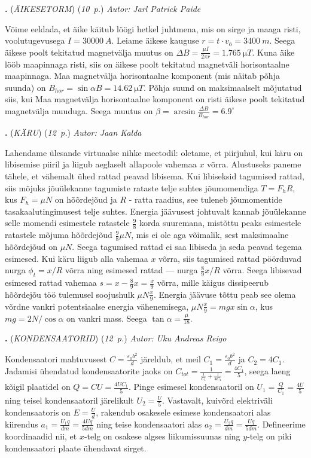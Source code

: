 \documentclass[11pt,a5paper]{article}
\newcommand{\numb}[1]{\vspace{5pt}\textbf{\large #1}}
\newcommand{\nimi}[1]{(\textsl{\small #1})}
\newcommand{\punktid}[1]{(\emph{#1~p.})}
\newcounter{ylesanne}
\newcommand{\yl}[1]{\addtocounter{ylesanne}{1}\numb{\theylesanne.} \nimi{#1} \newblock{}}
\newcommand{\autor}[1]{\emph{ Autor: #1}}%
\begin{document}
\newpage
\yl{ÄIKESETORM}
\punktid{10} \autor{Jarl Patrick Paide}

Võime eeldada, et äike käitub löögi hetkel juhtmena, mis on sirge ja maaga risti, voolutugevusega $I = \SI{30000}{A}$. Leiame äikese kauguse $r = t\cdot v_{õ} = \SI{3400}{m}$. Seega äikese poolt tekitatud magnetvälja muutus on $\Delta B = \frac{\mu I}{2\pi r} = \SI{1.765}{\micro T}$. Kuna äike lööb maapinnaga risti, siis on äikese poolt tekitatud magnetväli horisontaalne maapinnaga. Maa magnetvälja horisontaalne komponent (mis näitab põhja suunda) on $B_{hor} = \sin{\alpha}B = \SI{14.62}{\micro T}$. Põhja suund on maksimaalselt mõjutatud siis, kui Maa magnetvälja horisontaalne komponent on risti äikese poolt tekitatud magnetvälja muuduga. Seega muutus on $\beta = \arcsin{\frac{\Delta B}{B_{hor}}} = 6.9^{\circ}$



\yl{KÄRU}
\punktid{12} \autor{Jaan Kalda}

Lahendame ülesande virtuaalse nihke meetodil: oletame, et piirjuhul, kui käru on libisemise piiril ja liigub aeglaselt allapoole vahemaa $x$ võrra. Alustuseks paneme tähele, et vähemalt ühed rattad peavad libisema. Kui libiseksid tagumised rattad, siis mõjuks jõuülekanne tagumiste rataste telje suhtes jõumomendiga $T=F_hR$, kus $F_h=\mu N$ on hõõrdejõud ja $R$ - ratta raadius, see tuleneb jõumomentide tasakaalutingimusest telje suhtes. Energia jäävusest johtuvalt kannab jõuülekanne selle momendi esimestele ratastele $\frac 98$ korda suuremana, mistõttu peaks esimestele ratastele mõjuma hõõrdejõud $\frac 98\mu N$, mis ei ole aga võimalik, sest maksimaalne hõõrdejõud on $\mu N$. Seega tagumised rattad ei saa libiseda ja seda peavad tegema esimesed. Kui käru liigub alla vahemaa $x$ võrra, siis  tagumised rattad pöörduvad nurga $\phi_t=x/R$ võrra ning esimesed rattad --- nurga $\frac 89x/R$ võrra. Seega libisevad esimesed rattad vahemaa $s=x-\frac 89x=\frac x9$ võrra, mille käigus dissipeerub hõõrdejõu töö tulemusel soojushulk $\mu N\frac x9$. Energia jäävuse tõttu peab see olema võrdne vankri potentsiaalse energia vähenemisega, $\mu N\frac x9=mgx\sin\alpha$, kus $mg=2N/\cos\alpha$ on vankri mass. Seega $\tan\alpha = \frac \mu{18}$.




\yl{KONDENSAATORID}
\punktid{12} \autor{Uku Andreas Reigo}

Kondensaatori mahtuvusest $C = \frac{\varepsilon_0 b^2}{d}$ järeldub, et meil $C_1 = \frac{\varepsilon_0 b^2}{d}$ ja $C_2 = 4C_1$.
Jadamisi ühendatud kondensaatorite jaoks on $C_{tot} = \frac{1}{\frac{1}{C_1} + \frac{1}{4C_1}} = \frac{4C_1}{5}$, seega laeng kõigil plaatidel on $Q = CU = \frac{4UC_1}{5}$. Pinge esimesel kondensaatoril on $U_1 = \frac{Q}{C_1} = \frac{4U}{5}$ ning teisel kondensaatoril järelikult $U_2 = \frac{U}{5}$. Vastavalt, kuivõrd elektriväli kondensaatoris on $E=\frac{U}{d}$, rakendub osakesele esimese kondensaatori alas kiirendus $a_1 = \frac{U_1q}{dm} = \frac{4Uq}{5dm}$ ning teise kondensaatori alas $a_2 = \frac{U_2q}{dm} = \frac{Uq}{5dm}$.
Defineerime koordinaadid nii, et $x$-telg on osakese algses liikumissuunas ning $y$-telg on piki kondensaatori plaate ühendavat sirget.
\end{document}
